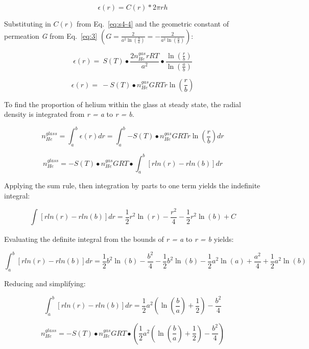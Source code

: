 \begin{equation}
\epsilon(r) = C(r)*2\pi rh
\label{eq:s4-5}
\end{equation}

Substituting in \(C(r)\) from Eq.~\eqref{eq:s4-4} and the geometric constant of
permeation \emph{G} from Eq.~\eqref{eq:3}
\(\left( G = \frac{2}{a^{2}\ln\left( \frac{b}{a} \right)} = - \frac{2}{a^{2}\ln\left( \frac{a}{b} \right)} \right)\):

\[
\epsilon(r) = \ S(T) \bullet \frac{2n_{He}^{gas}rRT}{a^{2}} \bullet \frac{\ln\left( \frac{r}{b} \right)}{\ln\left( \frac{a}{b} \right)}
\]

\begin{equation}
\epsilon(r) = \  - S(T) \bullet n_{He}^{gas}GRTr\ln\left( \frac{r}{b} \right)
\label{eq:4}
\end{equation}

To find the proportion of helium within the glass at steady state, the
radial density is integrated from \emph{r = a} to \emph{r = b}.

\[n_{He}^{glass} = \int_{a}^{b}{\epsilon(r)dr} = \int_{a}^{b}{- S(T) \bullet n_{He}^{gas}GRTr\ln\left( \frac{r}{b} \right)}dr\]

\[n_{He}^{glass} = - S(T) \bullet n_{He}^{gas}GRT \bullet \int_{a}^{b}\left\lbrack rln(r) - rln(b) \right\rbrack dr\]

Applying the sum rule, then integration by parts to one term yields the
indefinite integral:

\[\int_{}^{}\left\lbrack rln(r) - rln(b) \right\rbrack dr = \frac{1}{2}r^{2}\ln(r) - \frac{r^{2}}{4} - \frac{1}{2}r^{2}\ln(b) + C\]

Evaluating the definite integral from the bounds of \emph{r = a} to
\emph{r = b} yields:

\[\int_{a}^{b}\left\lbrack rln(r) - rln(b) \right\rbrack dr = \frac{1}{2}b^{2}\ln(b) - \frac{b^{2}}{4} - \frac{1}{2}b^{2}\ln{(b) -}\frac{1}{2}a^{2}\ln(a) + \frac{a^{2}}{4} + \frac{1}{2}a^{2}\ln(b)\]

Reducing and simplifying:

\[\int_{a}^{b}\left\lbrack rln(r) - rln(b) \right\rbrack dr = \frac{1}{2}a^{2}\left( \ln\left( \frac{b}{a} \right) + \frac{1}{2} \right) - \frac{b^{2}}{4}\]

\begin{equation}
n_{He}^{glass} = - S(T) \bullet n_{He}^{gas}GRT \bullet \left( \frac{1}{2}a^{2}\left( \ln\left( \frac{b}{a} \right) + \frac{1}{2} \right) - \frac{b^{2}}{4} \right)
\label{eq:s4-6}
\end{equation}

